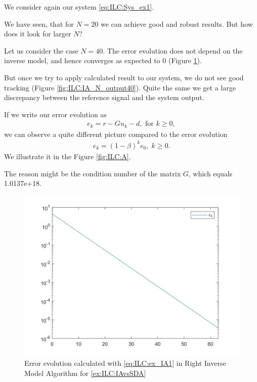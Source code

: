 \begin{exam}
	\label{ex:ILC:IAcrushes}
	We consider again our system \eqref{eq:ILC:Sys_ex1}. 
	
	We have seen, that for $N = 20$ we can achieve good and robust results. 
	But how does it look for larger $N$? 
	
	Let us consider the case $N = 40$. 
	The error evolution does not depend on the inverse model, and hence converges as expected to 0 (Figure \ref{fig:ILC:IA_N40}). 
	
	But once we try to apply calculated result to our system, we do not see good tracking (Figure \ref{fig:ILC:IA_N_output40}). Quite the same we get a large discrepancy between the reference signal and the system output. 
	
	If we write our error evolution as 
	\begin{align}
	\label{eq:ILC:ex_IA1}
	e_k = r - Gu_k - d, \text{ for } k \geq 0, \tag{*}
	\end{align}
	we can observe a quite different picture compared to the error evolution 
	\begin{align}
	\label{eq:ILC:ex_IA2}
	e_k = (1 - \beta)^k e_0,\; k\geq 0. \tag{**}
	\end{align}
	We illustrate it in the Figure \ref{fig:ILC:A}. 
	
	The reason might be the condition number of the matrix $G$, which equals 1.0137e+18. 
	
	
	\begin{figure}[ht!]
		\centering
		\includegraphics[width=\textwidth]{fig/IA_N40.jpg}
		\caption{Error evolution calculated with \eqref{eq:ILC:ex_IA1} in Right Inverse Model Algorithm for \ref{ex:ILC:IAvsSDA}}
		\label{fig:ILC:IA_N40}
	\end{figure}
	

\end{exam}
